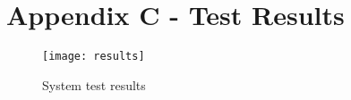 \newpage
\section{Appendix C - Test Results}\label{testResultsSec}
\begin{figure}[h]
	\centering
	\texttt{[image: results]}
	\caption{System test results}
	\label{test_results}
\end{figure}